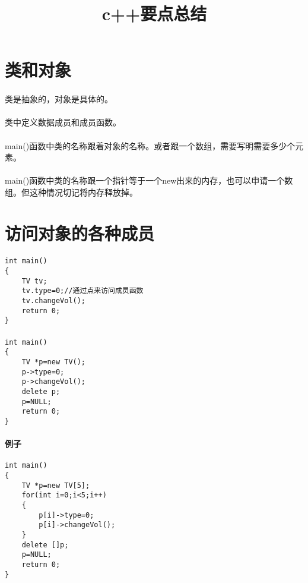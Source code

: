 \documentclass{article}
\begin{document}
\begin{CJK}{UTF8}{gbsn}
\title{c++要点总结}
\date{}
\maketitle
\section{类和对象}
\paragraph{}
类是抽象的，对象是具体的。
\paragraph{}
类中定义数据成员和成员函数。
\paragraph{}
main()函数中类的名称跟着对象的名称。或者跟一个数组，需要写明需要多少个元素。
\paragraph{}
main()函数中类的名称跟一个指针等于一个new出来的内存，也可以申请一个数组。但这种情况切记将内存释放掉。
\section{访问对象的各种成员}
\paragraph{}
\begin{verbatim}
int main()
{
	TV tv;
	tv.type=0;//通过点来访问成员函数
	tv.changeVol();
	return 0;
}
\end{verbatim}
\paragraph{}
\begin{verbatim}
int main()
{
	TV *p=new TV();  
	p->type=0;
	p->changeVol();
	delete p;
	p=NULL;
	return 0;
}
\end{verbatim}
\paragraph{例子}
\begin{verbatim}
int main()
{
	TV *p=new TV[5];
	for(int i=0;i<5;i++)
	{
		p[i]->type=0;
		p[i]->changeVol();
	}
	delete []p;
	p=NULL;
	return 0;
}
\end{verbatim}

\end{CJK}
\end{document}
